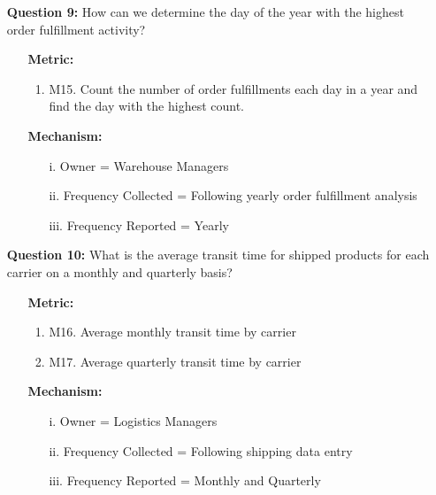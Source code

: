 \begin{itemize}
	\item[\textbullet] \textbf{Question 9:} How can we determine the day of the year with the highest order fulfillment activity? 
	\begin{itemize}
		\item[] \textbf{Metric:}
		\begin{enumerate}[label={}, left=0em]
			\item M15. Count the number of order fulfillments each day in a year and find the day with the highest count.
		\end{enumerate}
		\item[] \textbf{Mechanism:}
		\begin{enumerate}[label={}, left=0em]
			\item[i.] Owner = Warehouse Managers
			\item[ii.] Frequency Collected = Following yearly order fulfillment analysis
			\item[iii.] Frequency Reported = Yearly
		\end{enumerate}
	\end{itemize}
	
	\item[\textbullet] \textbf{Question 10:} What is the average transit time for shipped products for each carrier on a monthly and quarterly basis? 
	\begin{itemize}
		\item[] \textbf{Metric:}
		\begin{enumerate}[label={}, left=0em]
			\item M16. Average monthly transit time by carrier
			\item M17. Average quarterly transit time by carrier
		\end{enumerate}
		\item[] \textbf{Mechanism:}
		\begin{enumerate}[label={}, left=0em]
			\item[i.] Owner = Logistics Managers
			\item[ii.] Frequency Collected = Following shipping data entry
			\item[iii.] Frequency Reported = Monthly and Quarterly
		\end{enumerate}
	\end{itemize}
\end{itemize}